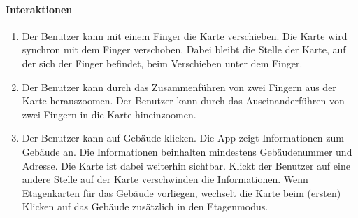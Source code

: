 \paragraph{Interaktionen}
\begin{enumerate}[start=11, label=\textbf{/FA\arabic*/}, align=left]
    \item Der Benutzer kann mit einem Finger die Karte verschieben. Die Karte wird synchron mit dem Finger verschoben. Dabei bleibt die Stelle der Karte, auf der sich der Finger befindet, beim Verschieben unter dem Finger.
    \item Der Benutzer kann durch das Zusammenführen von zwei Fingern aus der Karte herauszoomen. Der Benutzer kann durch das Auseinanderführen von zwei Fingern in die Karte hineinzoomen.
    \item Der Benutzer kann auf Gebäude klicken. Die App zeigt Informationen zum Gebäude an. Die Informationen beinhalten mindestens Gebäudenummer und Adresse. Die Karte ist dabei weiterhin sichtbar. Klickt der Benutzer auf eine andere Stelle auf der Karte verschwinden die Informationen. Wenn Etagenkarten für das Gebäude vorliegen, wechselt die Karte beim (ersten) Klicken auf das Gebäude zusätzlich in den Etagenmodus.
\end{enumerate}